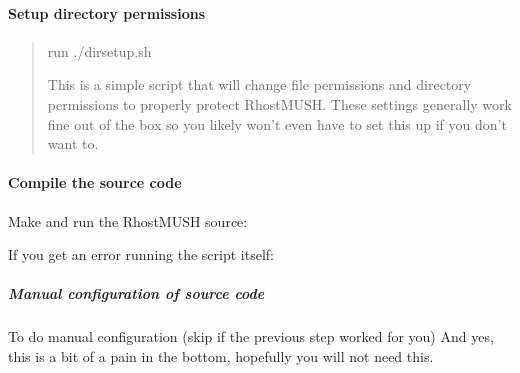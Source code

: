 \documentclass[letterpaper,10pt,english]{sphinxmanual}
\begin{document}
\paragraph{Setup directory permissions}
\label{\detokenize{installation:setup-directory-permissions}}\begin{quote}

\sphinxAtStartPar
run ./dirsetup.sh

\sphinxAtStartPar
This is a simple script that will change file permissions
and directory permissions to properly protect RhostMUSH.
These settings generally work fine out of the box so
you likely won’t even have to set this up if you don’t want to.
\end{quote}


\paragraph{Compile the source code}
\label{\detokenize{installation:compile-the-source-code}}
\sphinxAtStartPar
Make and run the RhostMUSH source:

\begin{sphinxVerbatim}[commandchars=\\\{\}]
   
\end{sphinxVerbatim}

\sphinxAtStartPar
If you get an error running the script itself:

\begin{sphinxVerbatim}[commandchars=\\\{\}]
 

   

           
        
\end{sphinxVerbatim}


\subparagraph{Manual configuration of source code}
\label{\detokenize{installation:manual-configuration-of-source-code}}
\sphinxAtStartPar
To do manual configuration (skip if the previous step worked for you) And yes, this is a bit of a pain in the bottom, hopefully you will not need this.
\end{document}
